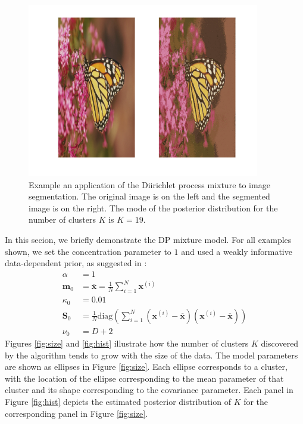 \documentclass[final,3p,times,twocolumn]{elsarticle}
\let\bs\boldsymbol
\let\ol\overline
\begin{document}
\begin{figure}
\includegraphics[width=\textwidth,height=3in]{output.png}
\caption{Example an application of the Diirichlet process mixture to image segmentation. 
The original image is on the left and the segmented image is on the right.
The mode of the posterior distribution for the number of clusters $K$ is $K=19$.}
\label{fig:pics}
\end{figure}

In this secion, we briefly demonstrate the DP mixture model.
For all examples shown, we set the concentration parameter to $1$ and used a weakly informative data-dependent prior, as suggested in \cite{Murphy}:
\begin{equation}
\begin{split}
\alpha &= 1\\
\bs m_0 &= \ol{\bs x} = \frac{1}{N}\sum_{i=1}^N \bs x^{(i)}\\
\kappa_0 &= 0.01\\
\bs S_0 &= \frac{1}{N}\mbox{diag}\left(\sum_{i=1}^N\left(\bs x^{(i)} - \ol{\bs x}\right)\left(\bs x^{(i)} - \ol{\bs x}\right)\right)\\
\nu_0 &= D + 2
\end{split}
\end{equation}
Figures \ref{fig:size} and \ref{fig:hist} illustrate how the number of clusters $K$ discovered by the algorithm tends to grow with the size of the data.
The model parameters are shown as ellipses in Figure \ref{fig:size}.
Each ellipse corresponds to a cluster, with the location of the ellipse corresponding to the mean parameter of that cluster and its shape corresponding to the covariance parameter.
Each panel in Figure \ref{fig:hist} depicts the estimated posterior distribution of $K$ for the corresponding panel in Figure \ref{fig:size}.
\end{document}
